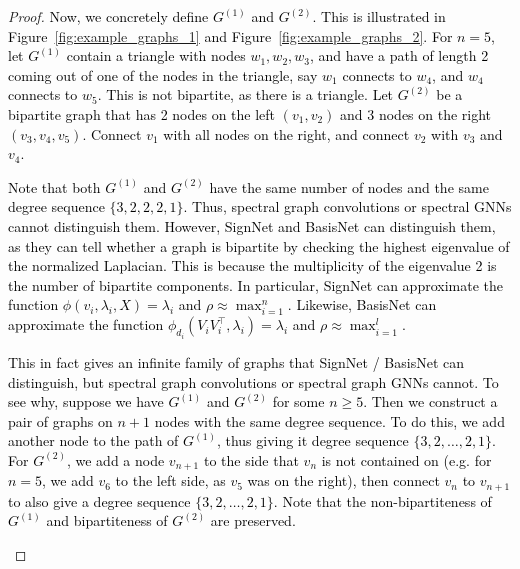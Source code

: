 \documentclass{article} \usepackage{iclr2023_conference,times}
\newcommand{\rebut}[1]{\textcolor{black}{#1}}
\begin{document}
\begin{proof}
    \rebut{Now, we concretely define $G^{(1)}$ and $G^{(2)}$. This is illustrated in Figure~\ref{fig:example_graphs_1} and Figure~\ref{fig:example_graphs_2}. For $n=5$, let $G^{(1)}$ contain a triangle with nodes $w_1, w_2, w_3$, and have a path of length 2 coming out of one of the nodes in the triangle, say $w_1$ connects to $w_4$, and $w_4$ connects to $w_5$. This is not bipartite, as there is a triangle. Let $G^{(2)}$ be a bipartite graph that has 2 nodes on the left $(v_1, v_2)$ and 3 nodes on the right $(v_3, v_4, v_5)$. Connect $v_1 $ with all nodes on the right, and connect $v_2$ with $v_3$ and $v_4$.}
    
    \rebut{Note that both $G^{(1)}$ and $G^{(2)}$ have the same number of nodes and the same degree sequence $\{3, 2, 2, 2, 1\}$. Thus, spectral graph convolutions or spectral GNNs cannot distinguish them. However, SignNet and BasisNet can distinguish them, as they can tell whether a graph is bipartite by checking the highest eigenvalue of the normalized Laplacian. This is because the multiplicity of the eigenvalue 2 is the number of bipartite components. In particular, SignNet can approximate the function $\phi(v_i, \lambda_i, X) = \lambda_i$ and $\rho \approx \max_{i=1}^n$. Likewise, BasisNet can approximate the function $\phi_{d_i}(V_i V_i^\top, \lambda_i) = \lambda_i$ and $\rho \approx \max_{i=1}^l$.
    }
    
    \rebut{
    This in fact gives an infinite family of graphs that SignNet / BasisNet can distinguish, but spectral graph convolutions or spectral graph GNNs cannot. To see why, suppose we have $G^{(1)}$ and $G^{(2)}$ for some $n \geq 5$. Then we construct a pair of graphs on $n+1$ nodes with the same degree sequence. To do this, we add another node to the path of $G^{(1)}$, thus giving it degree sequence $\{3, 2, \ldots, 2, 1\}$. For $G^{(2)}$, we add a node $v_{n+1}$ to the side that $v_n$ is not contained on (e.g. for $n = 5$, we add $v_6$ to the left side, as $v_5$ was on the right), then connect $v_n$ to $v_{n+1}$ to also give a degree sequence $\{3, 2, \ldots, 2, 1\}$. Note that the non-bipartiteness of $G^{(1)}$ and bipartiteness of $G^{(2)}$ are preserved.
    }

\begin{figure}
    \centering
\end{figure}
\end{proof}
\end{document}
